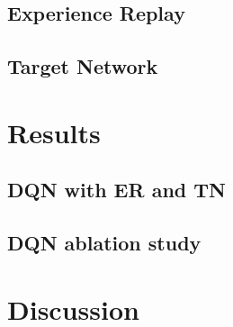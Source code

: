 \documentclass{article}
\begin{document}
\subsection{Experience Replay}
\label{subsec:experience-replay}

\subsection{Target Network}
\label{subsec:target-network}


\section{Results}
\label{sec:results}

\subsection{DQN with ER and TN}
\label{subsec:dqn-with-er-and-tn}


\subsection{DQN ablation study}
\label{subsec:dqn-ablation-study}


\section{Discussion}
\label{sec:discussion}


\end{document}
